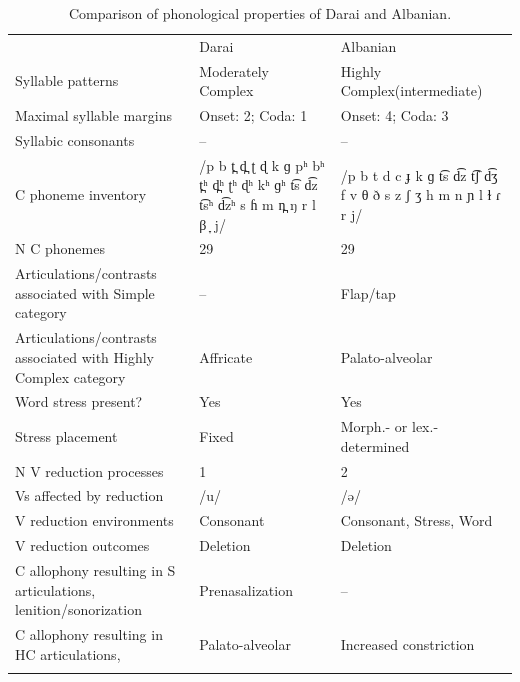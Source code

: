 \begin{table}
\small
\begin{tabularx}{\textwidth}{QQQ}
\lsptoprule
 & {Darai} & {Albanian}\\
 {Syllable patterns} & Moderately Complex & Highly Complex\newline (intermediate)\\
 \midrule 
 {Maximal syllable margins} & Onset: 2; Coda: 1 & Onset: 4; Coda: 3\\
 \tablevspace
 {Syllabic consonants} & -- & --\\
 \tablevspace
 {C phoneme inventory} & /p b t̪ d̪ ʈ ɖ k ɡ pʰ bʰ t̪ʰ d̪ʰ ʈʰ ɖʰ kʰ ɡʰ t͡s d͡z t͡sʰ d͡zʰ s ɦ m n̪ ŋ r l β ̞ j/ & /p b t d c ɟ k ɡ t͡s d͡z t͡ʃ d͡ʒ f v θ ð s z ʃ ʒ h m n ɲ l ɫ ɾ r j/\\
 \tablevspace
 {N C phonemes} & 29 & 29\\
 \tablevspace
 {Articulations/contrasts associated with {Simple}} {category} & {--} & {Flap/tap}\\
 \tablevspace
 {Articulations/contrasts associated with {Highly Complex}} {category} & {Affricate} & { {Palato-alveolar}}\\
 \tablevspace
 {Word stress present?} & {Yes} & {Yes}\\
 \tablevspace
 {Stress placement} & {Fixed} & {Morph.- or lex.-determined}\\
 \tablevspace
 {N V reduction processes} & {1} & {2}\\
 \tablevspace
 {Vs affected by reduction}  & {/u/} & {/ə/}\\
 \tablevspace
 {V reduction environments} & {Consonant} & {Consonant, Stress, Word}\\
 \tablevspace
 {V reduction outcomes} & {Deletion} & {Deletion}\\
 \tablevspace
 {C allophony resulting in S articulations, lenition/sonorization} & { {Prenasalization}} & {--}\\
 \tablevspace
{ {C allophony resulting in HC articulations,} } & { {Palato-alveolar}} & {Increased constriction}\\
\lspbottomrule
\end{tabularx}
\caption{\label{tab:8.6}Comparison of phonological properties of Darai and Albanian.}
\end{table}

